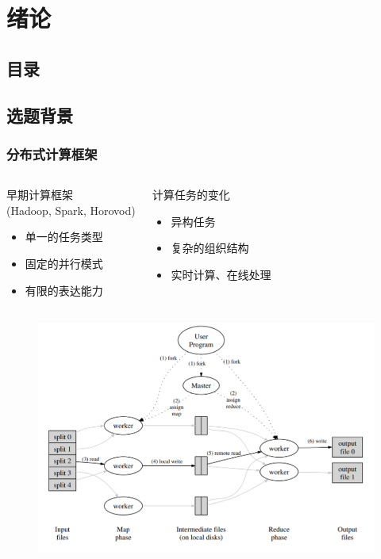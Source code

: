 \section{绪论}

\subsection*{目录}

\subsection*{选题背景}

\begin{frame}
	\frametitle{分布式计算框架}
	\vspace{-1.2em}
	\begin{columns}[t]
		\begin{block}{早期计算框架\\(Hadoop, Spark, Horovod)}
			\begin{itemize}
				\item 单一的任务类型
				\item 固定的并行模式
				\item 有限的表达能力
			\end{itemize}
		\end{block}
		\begin{block}{计算任务的变化}
			\begin{itemize}
				\item 异构任务
				\item 复杂的组织结构
				\item 实时计算、在线处理
			\end{itemize}
		\end{block}
	\end{columns}
	\begin{columns}[onlytextwidth]
		\begin{figure}
			\centering
			\includegraphics[width=\textwidth]{image/chap01/mapreduce.png}	

\end{figure}
\end{columns}
\end{frame}
